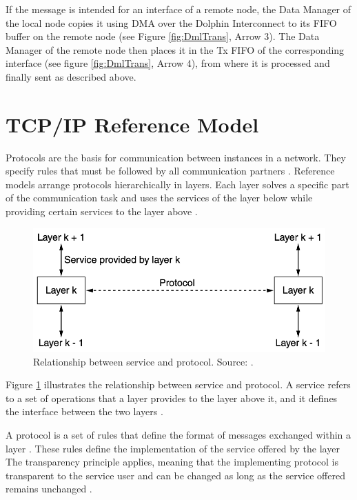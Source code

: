 If the message is intended for an interface of a remote node, the Data Manager of the local node copies it using DMA over the Dolphin Interconnect to its FIFO buffer on the remote node (see Figure \ref{fig:DmlTrans}, Arrow 3). The Data Manager of the remote node then places it in the Tx FIFO of the corresponding interface (see figure \ref{fig:DmlTrans}, Arrow 4), from where it is processed and finally sent as described above.


\section{TCP/IP Reference Model} \label{chap:RefModel}

Protocols are the basis for communication between instances in a network. They specify rules that must be followed by all communication partners \cite{Tanenbaum2010}. Reference models arrange protocols hierarchically in layers. Each layer solves a specific part of the communication task and uses the services of the layer below while providing certain services to the layer above \cite{Weigel2021}.

\begin{figure}[h]
    \centering
    \includegraphics[width=0.7\linewidth]{figures/tcpip_refmodel/image1.png}
    \caption[Relationship between service and protocol]{Relationship between service and protocol. Source: \cite{Tanenbaum2010}.}
    \label{fig:ServiceProtRelation}
\end{figure}

Figure \ref{fig:ServiceProtRelation} illustrates the relationship between service and protocol. A service refers to a set of operations that a layer provides to the layer above it, and it defines the interface between the two layers \cite{Tanenbaum2010}.

A protocol is a set of rules that define the format of messages exchanged within a layer \cite{Tanenbaum2010}. These rules define the implementation of the service offered by the layer The transparency principle applies, meaning that the implementing protocol is transparent to the service user and can be changed as long as the service offered remains unchanged \cite{Weigel2021}.

